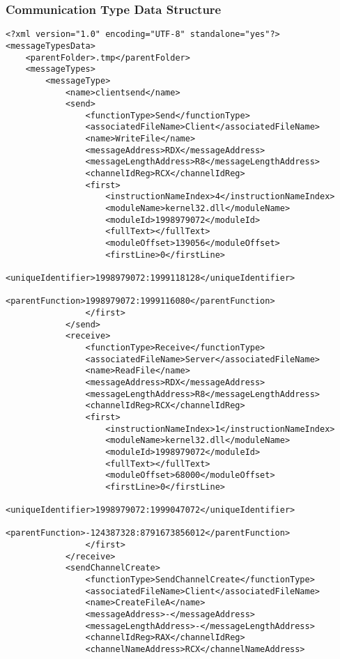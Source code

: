 \documentclass[paper=a4, fontsize=11pt]{scrartcl}
\numberwithin{equation}{section}		%
\numberwithin{figure}{section}			%
\numberwithin{table}{section}				%
\begin{document}
\subsubsection{Communication Type Data Structure}
\begin{lstlisting}
<?xml version="1.0" encoding="UTF-8" standalone="yes"?>
<messageTypesData>
    <parentFolder>.tmp</parentFolder>
    <messageTypes>
        <messageType>
            <name>clientsend</name>
            <send>
                <functionType>Send</functionType>
                <associatedFileName>Client</associatedFileName>
                <name>WriteFile</name>
                <messageAddress>RDX</messageAddress>
                <messageLengthAddress>R8</messageLengthAddress>
                <channelIdReg>RCX</channelIdReg>
                <first>
                    <instructionNameIndex>4</instructionNameIndex>
                    <moduleName>kernel32.dll</moduleName>
                    <moduleId>1998979072</moduleId>
                    <fullText></fullText>
                    <moduleOffset>139056</moduleOffset>
                    <firstLine>0</firstLine>
                    <uniqueIdentifier>1998979072:1999118128</uniqueIdentifier>
                    <parentFunction>1998979072:1999116080</parentFunction>
                </first>
            </send>
            <receive>
                <functionType>Receive</functionType>
                <associatedFileName>Server</associatedFileName>
                <name>ReadFile</name>
                <messageAddress>RDX</messageAddress>
                <messageLengthAddress>R8</messageLengthAddress>
                <channelIdReg>RCX</channelIdReg>
                <first>
                    <instructionNameIndex>1</instructionNameIndex>
                    <moduleName>kernel32.dll</moduleName>
                    <moduleId>1998979072</moduleId>
                    <fullText></fullText>
                    <moduleOffset>68000</moduleOffset>
                    <firstLine>0</firstLine>
                    <uniqueIdentifier>1998979072:1999047072</uniqueIdentifier>
                    <parentFunction>-124387328:8791673856012</parentFunction>
                </first>
            </receive>
            <sendChannelCreate>
                <functionType>SendChannelCreate</functionType>
                <associatedFileName>Client</associatedFileName>
                <name>CreateFileA</name>
                <messageAddress>-</messageAddress>
                <messageLengthAddress>-</messageLengthAddress>
                <channelIdReg>RAX</channelIdReg>
                <channelNameAddress>RCX</channelNameAddress>

\end{lstlisting}
\end{document}
